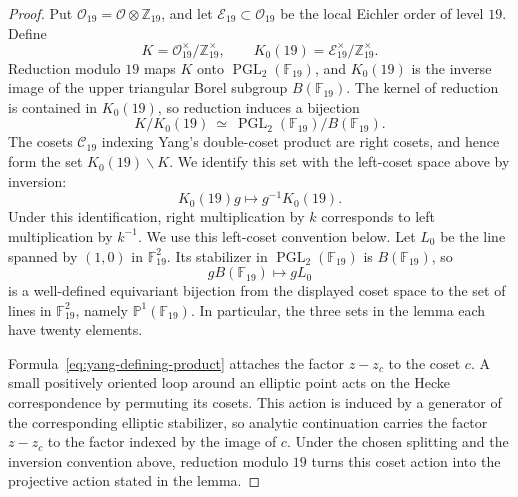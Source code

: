 \documentclass[10pt]{amsart}
\numberwithin{equation}{section}
\theoremstyle{definition}
\theoremstyle{remark}
\newcommand{\PP}{\mathbb P}
\newcommand{\F}{\mathbb{F}}
\newcommand{\Z}{\mathbb{Z}}
\newcommand{\PGL}{\operatorname{PGL}}
\begin{document}
\begin{proof}

Put $\mathcal O_{19}=\mathcal O\otimes\Z_{19}$, and let
  $\mathcal E_{19}\subset\mathcal O_{19}$ be the local Eichler order of level
  $19$. Define
  \[
   K=\mathcal O_{19}^{\times}/\Z_{19}^{\times},
   \qquad
   K_0(19)=\mathcal E_{19}^{\times}/\Z_{19}^{\times}.
  \]  
Reduction modulo $19$ maps $K$ onto
$\PGL_2(\F_{19})$, and $K_0(19)$ is the inverse image of the upper triangular
Borel subgroup $B(\F_{19})$.  The kernel of reduction is contained in
$K_0(19)$, so reduction induces a bijection
\[
 K/K_0(19)\ \simeq\
 \PGL_2(\F_{19})/B(\F_{19}).
\]
The cosets $\mathcal C_{19}$ indexing Yang's double-coset product are right
cosets, and hence form the set $K_0(19)\backslash K$.  We identify this set
with the left-coset space above by inversion:
\[
 K_0(19)g\longmapsto g^{-1}K_0(19).
\]
Under this identification, right multiplication by $k$ corresponds to left
multiplication by $k^{-1}$.  We use this left-coset convention below.
Let $L_0$ be the line spanned by $(1,0)$ in $\F_{19}^2$.  Its stabilizer in
$\PGL_2(\F_{19})$ is $B(\F_{19})$, so
\[
 gB(\F_{19})\longmapsto gL_0
\]
is a well-defined equivariant bijection from the displayed coset space to
the set of lines in $\F_{19}^2$, namely $\PP^1(\F_{19})$.  In particular,
the three sets in the lemma each have twenty elements.

Formula~\eqref{eq:yang-defining-product} attaches the factor $z-z_c$ to the
coset $c$.  A small positively oriented loop around an elliptic point acts on
the Hecke correspondence by permuting its cosets.  This action is induced by
a generator of the corresponding elliptic stabilizer, so analytic
continuation carries the factor $z-z_c$ to the factor indexed by the image of
$c$.
Under the chosen splitting and the inversion convention above, reduction
modulo $19$ turns this coset action into the projective action stated in the
lemma.
\end{proof}
\end{document}
